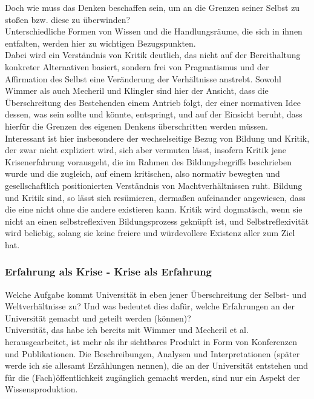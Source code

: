 \noindent Doch wie muss das Denken beschaffen sein, um an die Grenzen seiner Selbst zu
stoßen bzw. diese zu überwinden? \\
Unterschiedliche Formen von Wissen und die
Handlungsräume, die sich in ihnen entfalten, werden hier zu wichtigen
Bezugspunkten.\\
Dabei wird ein Verständnis von Kritik deutlich, das nicht auf
der Bereithaltung konkreter Alternativen basiert, sondern frei von Pragmatismus
und der Affirmation des Selbst eine Veränderung der Verhältnisse anstrebt.
Sowohl Wimmer als auch Mecheril und Klingler sind hier der Ansicht, dass die
Überschreitung des Bestehenden einem Antrieb folgt, der einer normativen Idee
dessen, was sein sollte und könnte, entspringt, und auf der Einsicht beruht,
dass hierfür die Grenzen des eigenen Denkens überschritten werden müssen.\\
Interessant ist hier insbesondere der wechselseitige Bezug von Bildung und
Kritik, der zwar nicht expliziert wird, sich aber vermuten lässt, insofern
Kritik jene Krisenerfahrung vorausgeht, die im Rahmen des Bildungsbegriffs
beschrieben wurde und die zugleich, auf einem kritischen, also normativ
bewegten und gesellschaftlich positionierten Verständnis von Machtverhältnissen
ruht. Bildung und Kritik sind, so lässt sich resümieren, dermaßen aufeinander
angewiesen, dass die  eine nicht ohne die andere existieren kann. Kritik wird
dogmatisch, wenn sie nicht an einen selbstreflexiven Bildungsprozess geknüpft
ist, und Selbstreflexivität wird beliebig, solang sie keine freiere und
würdevollere Existenz aller zum Ziel hat. 

\subsubsection{Erfahrung als Krise - Krise als Erfahrung}

Welche Aufgabe kommt Universität in eben jener Überschreitung der Selbst- und
Weltverhältnisse zu? Und was bedeutet dies dafür, welche Erfahrungen an der
Universität gemacht und geteilt werden (können)? \\
Universität, das habe ich
bereits mit Wimmer und Mecheril et al. herausgearbeitet, ist mehr als ihr
sichtbares Produkt in Form von Konferenzen und Publikationen. Die
Beschreibungen, Analysen und Interpretationen (später werde ich sie allesamt
Erzählungen nennen), die an der Universität entstehen und für die
(Fach)öffentlichkeit zugänglich gemacht werden, sind nur ein Aspekt der
Wissensproduktion.\\ 

